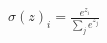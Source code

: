\documentclass[preview]{standalone}
\begin{document}
\begin{align*}
\sigma(z)_i = \frac{e^{z_i}}{\sum_{j} e^{z_j}}
\end{align*}
\end{document}

